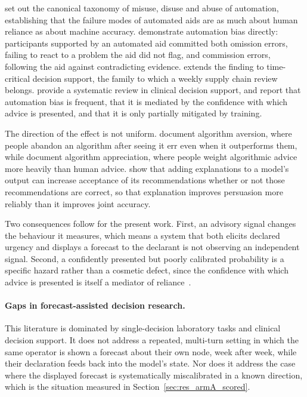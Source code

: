 \textcite{parasuraman1997humans} set out the canonical taxonomy of
misuse, disuse and abuse of automation, establishing that the failure modes of automated
aids are as much about human reliance as about machine accuracy. \textcite{skitka1999automation} demonstrate automation bias directly: participants
supported by an automated aid committed both omission errors, failing to react to a problem
the aid did not flag, and commission errors, following the aid against contradicting
evidence. \textcite{cummings2004automation} extends the finding to time-critical
decision support, the family to which a weekly supply chain review belongs. \textcite{goddard2012automation} provide a systematic review in clinical
decision support, and report that automation bias is frequent, that it is mediated by the
confidence with which advice is presented, and that it is only partially mitigated by
training.

The direction of the effect is not uniform. \textcite{dietvorst2015algorithm} document algorithm aversion, where people abandon
an algorithm after seeing it err even when it outperforms them, while
\textcite{logg2019algorithm} document algorithm appreciation, where
people weight algorithmic advice more heavily than human advice. \textcite{bansal2021whole} show that adding explanations to a model's output can
increase acceptance of its recommendations whether or not those recommendations are
correct, so that explanation improves persuasion more reliably than it improves joint
accuracy.

Two consequences follow for the present work. First, an advisory signal changes the
behaviour it measures, which means a system that both elicits declared urgency and displays
a forecast to the declarant is not observing an independent signal. Second, a confidently
presented but poorly calibrated probability is a specific hazard rather than a cosmetic
defect, since the confidence with which advice is presented is itself a mediator of
reliance~\autocite{goddard2012automation}.

\paragraph{Gaps in forecast-assisted decision research.}
This literature is dominated by single-decision laboratory tasks and clinical decision
support. It does not address a repeated, multi-turn setting in which the same operator is
shown a forecast about their own node, week after week, while their declaration feeds back
into the model's state. Nor does it address the case where the displayed forecast is
systematically miscalibrated in a known direction, which is the situation measured in
Section~\ref{sec:res_armA_scored}.

